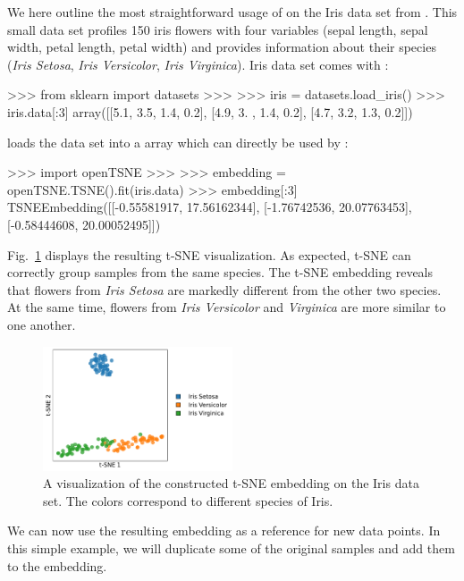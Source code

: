\documentclass[article]{jss}
\newcommand{\opentsne}{\pkg{openTSNE}\xspace}
\begin{document}
We here outline the most straightforward usage of \opentsne on the Iris data set from \citet{anderson1936species}. This small data set profiles 150 iris flowers with four variables (sepal length, sepal width, petal length, petal width) and provides information about their species ({\em Iris Setosa}, {\em Iris Versicolor}, {\em Iris Virginica}). Iris data set comes with :
\begin{CodeChunk}
\begin{CodeInput}
>>> from sklearn import datasets
>>>
>>> iris = datasets.load_iris()
>>> iris.data[:3]
array([[5.1, 3.5, 1.4, 0.2],
       [4.9, 3. , 1.4, 0.2],
       [4.7, 3.2, 1.3, 0.2]])
\end{CodeInput}
\end{CodeChunk}
 loads the data set into a  array which can directly be used by \opentsne:
\begin{CodeChunk}
\begin{CodeInput}
>>> import openTSNE
>>>
>>> embedding = openTSNE.TSNE().fit(iris.data)
>>> embedding[:3]
TSNEEmbedding([[-0.55581917, 17.56162344],
               [-1.76742536, 20.07763453],
               [-0.58444608, 20.00052495]])
\end{CodeInput}
\end{CodeChunk}
Fig.~\ref{fig:iris} displays the resulting t-SNE visualization. As expected, t-SNE can correctly group samples from the same species. The t-SNE embedding reveals that flowers from {\em Iris Setosa} are markedly different from the other two species. At the same time, flowers from {\em Iris Versicolor} and {\em Virginica} are more similar to one another.
\begin{figure}[htbp]
  \centering
  \includegraphics[width=0.5\textwidth]{iris}
  \caption{\label{fig:iris}
  A visualization of the constructed t-SNE embedding on the Iris data set. The colors correspond to different species of Iris.
}
\end{figure}
We can now use the resulting embedding as a reference for new data points. In this simple example, we will duplicate some of the original samples and add them to the embedding.
\end{document}

